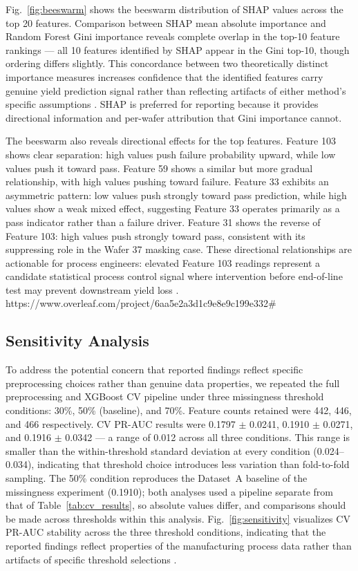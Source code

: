 \documentclass[conference]{IEEEtran}
\begin{document}
Fig.~\ref{fig:beeswarm} shows the beeswarm distribution of SHAP 
values across the top 20 features. Comparison between SHAP mean 
absolute importance and Random Forest Gini importance reveals 
complete overlap in the top-10 feature rankings --- all 10 features 
identified by SHAP appear in the Gini top-10, though ordering differs 
slightly. This concordance between two theoretically distinct 
importance measures increases confidence that the identified 
features carry genuine yield prediction signal rather than 
reflecting artifacts of either method's specific assumptions 
\cite{lundberg2020local}. SHAP is preferred for reporting because 
it provides directional information and per-wafer attribution that 
Gini importance cannot.

The beeswarm also reveals directional effects for the top features. 
Feature 103 shows clear separation: high values push failure 
probability upward, while low values push it toward pass. Feature 
59 shows a similar but more gradual relationship, with high values 
pushing toward failure. Feature 33 exhibits an asymmetric pattern: 
low values push strongly toward pass prediction, while high values 
show a weak mixed effect, suggesting Feature 33 operates primarily 
as a pass indicator rather than a failure driver. Feature 31 shows 
the reverse of Feature 103: high values push strongly toward pass, 
consistent with its suppressing role in the Wafer 37 masking case. 
These directional relationships are actionable for process 
engineers: elevated Feature 103 readings represent a candidate 
statistical process control signal where intervention before 
end-of-line test may prevent downstream yield loss 
\cite{wang2024improved}.
https://www.overleaf.com/project/6aa5e2a3d1c9e8e9c199e332#
\subsection{Sensitivity Analysis}
\label{sec:sensitivity}

To address the potential concern that reported findings reflect 
specific preprocessing choices rather than genuine data properties, 
we repeated the full preprocessing and XGBoost CV pipeline under 
three missingness threshold conditions: 30\%, 50\% (baseline), 
and 70\%. Feature counts retained were 442, 446, and 466 
respectively. CV PR-AUC results were 0.1797 $\pm$ 0.0241, 
0.1910 $\pm$ 0.0271, and 0.1916 $\pm$ 0.0342 --- a range of 
0.012 across all three conditions. This range is smaller than the 
within-threshold standard deviation at every condition 
(0.024--0.034), indicating that threshold choice introduces less 
variation than fold-to-fold sampling. The 50\% condition reproduces the Dataset~A baseline of the 
missingness experiment (0.1910); both analyses used a pipeline 
separate from that of Table~\ref{tab:cv_results}, so absolute values 
differ, and comparisons should be made
across thresholds within this analysis. Fig.~\ref{fig:sensitivity} visualizes CV 
PR-AUC stability across the three threshold conditions, indicating 
that the reported findings reflect properties of the manufacturing 
process data rather than artifacts of specific threshold selections 
\cite{park2026data}.
\end{document}
